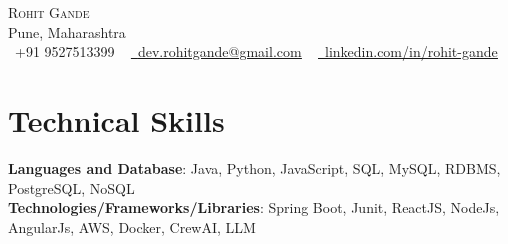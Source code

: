\documentclass[letterpaper,11pt]{article}
\begin{document}
\begin{center}
	{\Huge \scshape \color{accent}Rohit Gande} \\ \vspace{1pt}
	\color{black}Pune, Maharashtra \\ \vspace{1pt}
	\small \raisebox{-0.1\height}\faPhone\ +91 9527513399 ~ \href{mailto:dev.rohitgande@gmail.com}{\raisebox{-0.2\height}\faEnvelope\  \underline{dev.rohitgande@gmail.com}} ~
	\href{https://linkedin.com/in/rohit-gande}{\raisebox{-0.2\height}\faLinkedin\ \underline{linkedin.com/in/rohit-gande}}
	\vspace{-8pt}
\end{center}

\section{Technical Skills}
 \begin{itemize}[leftmargin=0.15in, label={}]
	\small{\item{
 	\textbf{Languages and Database}{: Java, Python, JavaScript, SQL, MySQL, RDBMS, PostgreSQL, NoSQL} \\
 	\textbf{Technologies/Frameworks/Libraries}{: Spring Boot, Junit, ReactJS, NodeJs, AngularJs, AWS, Docker, CrewAI, LLM}
	}}
 \end{itemize}
 \vspace{-16pt}
\end{document}
